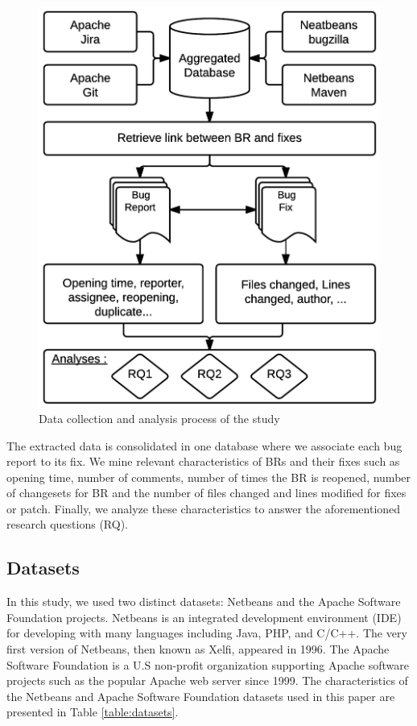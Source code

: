 \begin{figure}[h!]
  \centering
    \includegraphics{media/bug-taxo-flow.png}
    \caption{Data collection and analysis process of the study
    \label{fig:bug-taxo-flow}}
\end{figure}


The extracted data is
consolidated in one database where we associate each bug
report to its fix. We mine relevant characteristics of BRs and
their fixes such as opening time, number of comments,
number of times the BR is reopened, number of changesets
for BR and the number of files changed and lines modified
for fixes or patch. Finally, we analyze these characteristics to
answer the aforementioned research questions (RQ).


\subsection{Datasets}

In this study, we used two distinct datasets: Netbeans and
the Apache Software Foundation projects. Netbeans is an
integrated development environment (IDE) for developing
with many languages including Java, PHP, and C/C++. The
very first version of Netbeans, then known as Xelfi, appeared
in 1996. The Apache Software Foundation is a U.S non-profit
organization supporting Apache software projects such as the
popular Apache web server since 1999. The characteristics of
the Netbeans and Apache Software Foundation datasets used
in this paper are presented in Table \ref{table:datasets}.

